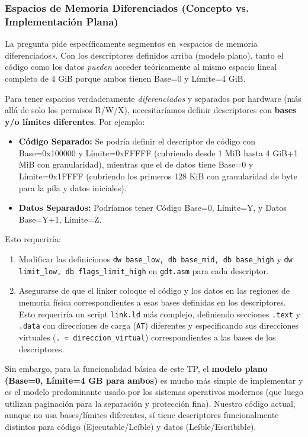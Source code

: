 \subsubsection{Espacios de Memoria Diferenciados (Concepto vs. Implementación Plana)}

La pregunta pide específicamente segmentos en «espacios de memoria diferenciados». Con los descriptores definidos arriba (modelo plano), tanto el código como los datos \textit{pueden} acceder teóricamente al mismo espacio lineal completo de 4 GiB porque ambos tienen Base=0 y Límite=4 GiB.

Para tener espacios verdaderamente \textit{diferenciados} y separados por hardware (más allá de solo los permisos R/W/X), necesitaríamos definir descriptores con \textbf{bases y/o límites diferentes}. Por ejemplo:

\begin{itemize}
    \item \textbf{Código Separado:} Se podría definir el descriptor de código con Base=0x100000 y Límite=0xFFFFF (cubriendo desde 1 MiB hasta 4 GiB+1 MiB con granularidad), mientras que el de datos tiene Base=0 y Límite=0x1FFFF (cubriendo los primeros 128 KiB con granularidad de byte para la pila y datos iniciales).
    \item \textbf{Datos Separados:} Podríamos tener Código Base=0, Límite=Y, y Datos Base=Y+1, Límite=Z.
\end{itemize}
\newpage
Esto requeriría:
\begin{enumerate}
    \item Modificar las definiciones \texttt{dw base\_low, db base\_mid, db base\_high} y \texttt{dw limit\_low, db flags\_limit\_high} en \texttt{gdt.asm} para cada descriptor.
    \item Asegurarse de que el linker coloque el código y los datos en las regiones de memoria física correspondientes a esas bases definidas en los descriptores. Esto requeriría un script \texttt{link.ld} más complejo, definiendo secciones \texttt{.text} y \texttt{.data} con direcciones de carga (\texttt{AT}) diferentes y especificando sus direcciones virtuales (\texttt{. = direccion\_virtual}) correspondientes a las bases de los descriptores.
\end{enumerate}

Sin embargo, para la funcionalidad básica de este TP, el \textbf{modelo plano (Base=0, Límite=4 GB para ambos)} es mucho más simple de implementar y es el modelo predominante usado por los sistemas operativos modernos (que luego utilizan paginación para la separación y protección fina). Nuestro código actual, aunque no usa bases/límites diferentes, sí tiene descriptores funcionalmente distintos para código (Ejecutable/Leíble) y datos (Leíble/Escribible).

